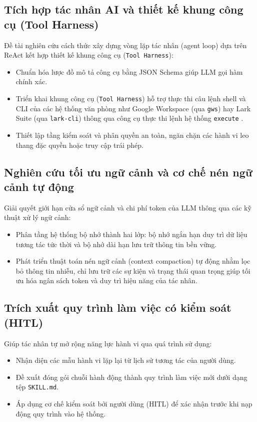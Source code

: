 \subsection{Tích hợp tác nhân AI và thiết kế khung công cụ (Tool Harness)}
Đề tài nghiên cứu cách thức xây dựng vòng lặp tác nhân (agent loop) dựa trên ReAct kết hợp thiết kế khung công cụ (\texttt{Tool Harness}):
\begin{itemize}
  \item Chuẩn hóa lược đồ mô tả công cụ bằng JSON Schema giúp LLM gọi hàm chính xác.
  \item Triển khai khung công cụ (\texttt{Tool Harness}) hỗ trợ thực thi câu lệnh shell và CLI của các hệ thống văn phòng như Google Workspace (qua \texttt{gws}) hay Lark Suite (qua \texttt{lark-cli}) thông qua công cụ thực thi lệnh hệ thống \texttt{execute} \cite{googleworkspaceCli,larkCli}.
  \item Thiết lập tầng kiểm soát và phân quyền an toàn, ngăn chặn các hành vi leo thang đặc quyền hoặc truy cập trái phép.
\end{itemize}

\subsection{Nghiên cứu tối ưu ngữ cảnh và cơ chế nén ngữ cảnh tự động}
Giải quyết giới hạn cửa sổ ngữ cảnh và chi phí token của LLM thông qua các kỹ thuật xử lý ngữ cảnh:
\begin{itemize}
  \item Phân tầng hệ thống bộ nhớ thành hai lớp: bộ nhớ ngắn hạn duy trì dữ liệu tương tác tức thời và bộ nhớ dài hạn lưu trữ thông tin bền vững.
  \item Phát triển thuật toán nén ngữ cảnh (context compaction) tự động nhằm lọc bỏ thông tin nhiễu, chỉ lưu trữ các sự kiện và trạng thái quan trọng giúp tối ưu hóa ngân sách token và duy trì hiệu năng của tác nhân.
\end{itemize}

\subsection{Trích xuất quy trình làm việc có kiểm soát (HITL)}
Giúp tác nhân tự mở rộng năng lực hành vi qua quá trình sử dụng:
\begin{itemize}
  \item Nhận diện các mẫu hành vi lặp lại từ lịch sử tương tác của người dùng.
  \item Đề xuất đóng gói chuỗi hành động thành quy trình làm việc mới dưới dạng tệp \texttt{SKILL.md}.
  \item Áp dụng cơ chế kiểm soát bởi người dùng (HITL) để xác nhận trước khi nạp động quy trình vào hệ thống.
\end{itemize}

